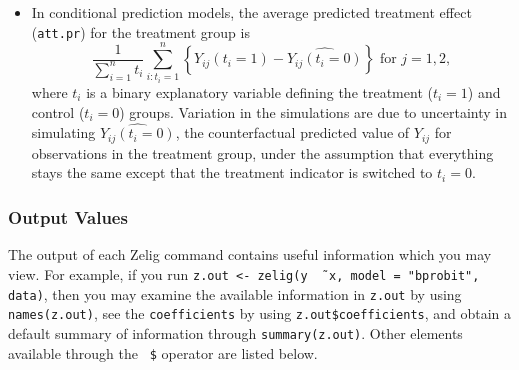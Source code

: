 \begin{itemize}
\item In conditional prediction models, the average predicted treatment
  effect ({\tt att.pr}) for the treatment group is 
    \begin{equation*} \frac{1}{\sum_{i=1}^n t_i}\sum_{i:t_i=1}^n \left\{ Y_{ij}(t_i=1) -
      \widehat{Y_{ij}(t_i=0)}\right\} \textrm{ for } j = 1,2,
    \end{equation*} 
    where $t_i$ is a binary explanatory variable defining the treatment
    ($t_i=1$) and control ($t_i=0$) groups.  Variation in the
    simulations are due to uncertainty in simulating
    $\widehat{Y_{ij}(t_i=0)}$, the counterfactual predicted value of
    $Y_{ij}$ for observations in the treatment group, under the
    assumption that everything stays the same except that the
    treatment indicator is switched to $t_i=0$.

\end{itemize}

\subsubsection{Output Values}

The output of each Zelig command contains useful information which you
may view.  For example, if you run \texttt{z.out <- zelig(y \~\, x,
  model = "bprobit", data)}, then you may examine the available
information in \texttt{z.out} by using \texttt{names(z.out)},
see the {\tt coefficients} by using {\tt z.out\$coefficients}, and
obtain a default summary of information through
\texttt{summary(z.out)}.  Other elements available through the {\tt
  \$} operator are listed below.

